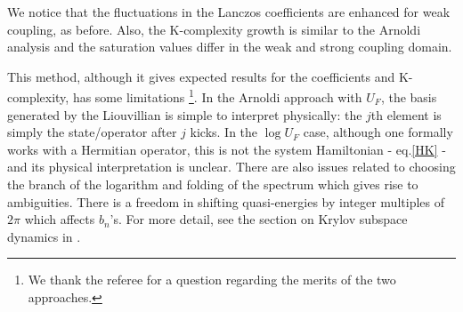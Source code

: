 \documentclass[a4paper,12pt]{article}
\begin{document}
We notice that the fluctuations in the Lanczos coefficients are enhanced for weak coupling, as before. Also, the K-complexity growth is similar to the Arnoldi analysis and the saturation values differ in the weak and strong coupling domain. 

This method, although it gives expected results for the coefficients and K-complexity, has some limitations \footnote{We thank the referee for a question regarding the merits of the two approaches.}.  In the Arnoldi approach with $U_F$, the basis generated by the Liouvillian is simple to interpret physically: the $j$th element is simply the state/operator after $j$ kicks. In the $\log U_F$ case, although one formally works with a Hermitian operator, this is not the system Hamiltonian - eq.\eqref{HK} - and its physical interpretation is unclear. There are also issues related to choosing the branch of the logarithm and folding of the spectrum which gives rise to ambiguities. There is a freedom in shifting quasi-energies by integer multiples of $2\pi$ which affects $b_n$’s.  For more detail, see the section on Krylov subspace dynamics in \cite{Yates:2021lrt}. 


\printbibliography

\end{document}

